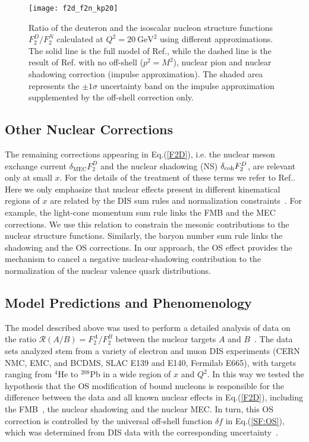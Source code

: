 \documentclass[%
      aps,
      prd,
      floatfix,
      preprintnumbers,
      preprint,
      showpacs,
      nofootinbib,
      tightenlines,
      amssymb,
      amsmath
]{revtex4-1}
\newcommand{\gevsq}  {\:\mathrm{GeV}^2}
\newcommand{\eq}[1]{Eq.(\ref{#1})}
\begin{document}
\begin{figure}[htb] %
\begin{center}
\texttt{[image: f2d\_f2n\_kp20]}
\caption{%
Ratio of the deuteron and the isoscalar nucleon structure functions $F_2^D/F_2^N$ calculated at $Q^2=20\gevsq$
using different approximations. The solid line is the full model of Ref.\cite{KP04}, 
while the dashed line is the result of Ref.\cite{KP04} with no off-shell ($p^2=M^2$), 
nuclear pion and nuclear shadowing correction (impulse approximation). The shaded area represents the 
$\pm 1 \sigma$ uncertainty band on the impulse approximation supplemented by the off-shell correction only.
}
\label{fig:d_n}
\end{center}
\end{figure}


\subsection{Other Nuclear Corrections} 
\label{sec:others} 


The remaining corrections appearing in \eq{F2D}, i.e. the nuclear meson exchange current 
$\delta_\mathrm{MEC} F_2^D$ and the nuclear shadowing (NS) $\delta_{\rm coh} F_2^D$,  
are relevant only at small $x$.
For the details of the treatment of these terms we refer to Ref.\cite{KP04}.
Here we only emphasize that nuclear effects present in different kinematical regions of
$x$ are related by the DIS sum rules and normalization constraints~\cite{KP14}.
For example, the light-cone momentum sum rule links the FMB and the MEC corrections. 
We use this relation to constrain the mesonic contributions to the nuclear structure functions. 
Similarly, the baryon number sum rule links the shadowing and the OS corrections. 
In our approach, the OS effect provides the mechanism to cancel a negative nuclear-shadowing 
contribution to the normalization of the nuclear valence quark distributions.


\subsection{Model Predictions and Phenomenology} 
\label{sec:phen} 


The model described above was used to perform a detailed analysis of data on 
the ratio $\mathcal R(A/B) = F_2^A/F_2^B$ between the nuclear targets $A$ and $B$~\cite{KP04}.  
The data sets analyzed stem from a variety of electron and muon DIS experiments 
(CERN NMC, EMC, and BCDMS, SLAC E139 and E140, Fermilab E665), with targets ranging from $^4$He to $^{208}$Pb 
in a wide region of $x$ and $Q^2$.
In this way we tested the hypothesis that the OS modification of bound nucleons is responsible for 
the difference between the data and all known nuclear effects in \eq{F2D}, including the 
FMB~\cite{Akulinichev:1985ij,Kulagin:1989mu}, the nuclear shadowing and the nuclear MEC.  
In turn, this OS correction is controlled by the universal off-shell function $\delta f$ in \eq{SF:OS}, 
which was determined from DIS data with the corresponding uncertainty~\cite{KP04}.  
\end{document}
